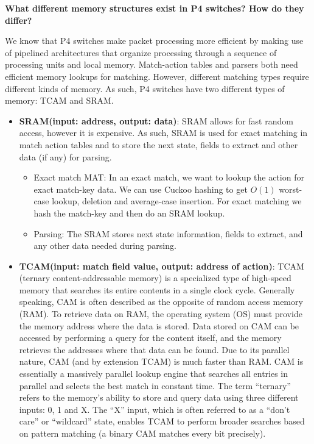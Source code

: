 \documentclass[11pt,oneside,a4paper]{article}
\begin{document}
\noindent \textbf{What different memory structures exist in P4 switches? How do they differ?}

We know that P4 switches make packet processing more efficient by making use of pipelined architectures that organize processing through a sequence of processing units and local memory. Match-action tables and parsers both need efficient memory lookups for matching. However, different matching types require different kinds of memory. As such, P4 switches have two different types of memory: TCAM and SRAM.

\vspace{-\topsep}
\begin{itemize}
	\setlength{\itemsep}{0pt}
	\setlength{\parskip}{0pt}
	\item \textbf{SRAM(input: address, output: data)}: SRAM allows for fast random access, however it is expensive. As such, SRAM is used for exact matching in match action tables and to store the next state, fields to extract and other data (if any) for parsing.
	
	\begin{itemize}
		\item Exact match MAT: In an exact match, we want to lookup the action for exact match-key data. We can use Cuckoo hashing to get $O(1)$ worst-case lookup, deletion and average-case insertion. For exact matching we hash the match-key and then do an SRAM lookup.
		\item Parsing: The SRAM stores next state information, fields to extract, and any other data needed during parsing.
	\end{itemize}	
	
	\item \textbf{TCAM(input: match field value, output: address of action)}: TCAM (ternary content-addressable memory) is a specialized type of high-speed memory that searches its entire contents in a single clock cycle. Generally speaking, CAM is often described as the opposite of random access memory (RAM). To retrieve data on RAM, the operating system (OS) must provide the memory address where the data is stored. Data stored on CAM can be accessed by performing a query for the content itself, and the memory retrieves the addresses where that data can be found. Due to its parallel nature, CAM (and by extension TCAM) is much faster than RAM. CAM is essentially a massively parallel lookup engine that searches all entries in parallel and selects the best match in constant time. The term “ternary” refers to the memory's ability to store and query data using three different inputs: 0, 1 and X. The “X” input, which is often referred to as a “don’t care” or “wildcard” state, enables TCAM to perform broader searches based on pattern matching (a binary CAM matches	every bit precisely).
	

\end{itemize}
\end{document}

